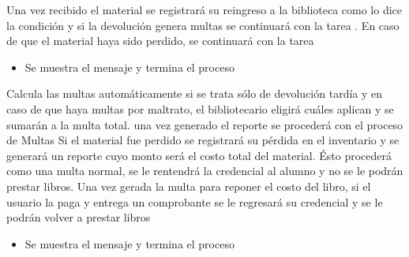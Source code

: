 \begin{PDescripcion}
\begin{enumerate}
      \Ppaso[\itarea]  Una vez recibido el material se registrará su reingreso a la biblioteca como lo dice la condición   y si la devolución genera multas se continuará con la tarea . En caso de que el material haya sido perdido, se continuará con la tarea \Ppaso[\itarea]  
      \begin{itemize}
	  \item Se muestra el mensaje  y termina el proceso
	\end{itemize}
      \Ppaso[\itarea]  Calcula las multas automáticamente si se trata sólo de devolución tardía y en caso de que haya multas por maltrato, el bibliotecario eligirá cuáles aplican y se sumarán a la multa total. una vez generado el reporte se procederá con el proceso de Multas
      \Ppaso[\itarea]  Si el material fue perdido se registrará su pérdida en el inventario y se generará un reporte cuyo monto será el costo total del material. Ésto procederá como una multa normal, se le rentendrá la credencial al alumno y no se le podrán prestar libros. 
      \Ppaso[\itarea]  Una vez gerada la multa para reponer el costo del libro, si el usuario la paga y entrega un comprobante se le regresará su credencial y se le podrán volver a prestar libros 
      \begin{itemize}
	  \item Se muestra el mensaje  y termina el proceso
	\end{itemize}

    \end{enumerate}

\end{PDescripcion}
